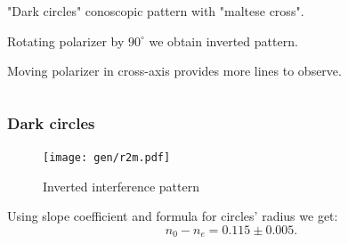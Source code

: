 \documentclass{beamer}
\begin{document}
\begin{frame}
\begin{columns}[t]
\begin{column}{0.5\textwidth}
				"Dark circles" conoscopic pattern with "maltese cross".
			
				Rotating polarizer by $90^{\circ}$ we obtain inverted pattern.
				
				Moving polarizer in cross-axis provides more lines to observe.
			\end{column}
		\end{columns}	
	
	\end{frame}

	\begin{frame}
		\frametitle{Dark circles}
		
		\begin{figure}
			\centering
			\texttt{[image: gen/r2m.pdf]}
			\vspace{-10pt}
			\caption{\footnotesize  Inverted interference pattern}
		\end{figure}
	
		Using slope coefficient and formula for circles' radius we get:
		$$ n_0 - n_e = 0.115 \pm 0.005.$$
	
	\end{frame}	
	
\end{document}
